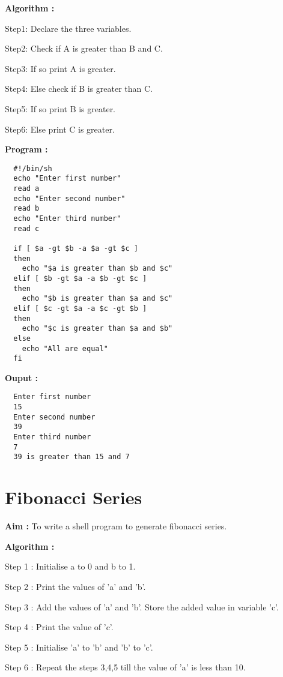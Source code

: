 \documentclass[journal,onecolumn]{IEEEtran}
\begin{document}
\textbf{Algorithm : }
\begin{list}{}{}
  \item Step1: Declare the three variables.
  \item Step2: Check if A is greater than B and
        C.
  \item Step3: If so print A is greater.
  \item Step4: Else check if B is greater than
        C.
  \item Step5: If so print B is greater.
  \item Step6: Else print C is greater.
\end{list}

\textbf{Program : }
\begin{verbatim}
  #!/bin/sh
  echo "Enter first number"
  read a
  echo "Enter second number"
  read b
  echo "Enter third number"
  read c

  if [ $a -gt $b -a $a -gt $c ]
  then
    echo "$a is greater than $b and $c"
  elif [ $b -gt $a -a $b -gt $c ]
  then
    echo "$b is greater than $a and $c"
  elif [ $c -gt $a -a $c -gt $b ]
  then
    echo "$c is greater than $a and $b"
  else
    echo "All are equal"
  fi
\end{verbatim}

\textbf{Ouput :}
\begin{verbatim}
  Enter first number
  15
  Enter second number
  39
  Enter third number
  7 
  39 is greater than 15 and 7
\end{verbatim}

\section{Fibonacci Series}
\textbf{Aim : } To write a shell program to generate fibonacci series.

\textbf{Algorithm : }
\begin{list}{}{}
  \item Step 1 : Initialise a to 0 and b to
        1.
  \item Step 2 : Print the values of 'a'
        and 'b'.
  \item Step 3 : Add the values of 'a' and 'b'. Store the added value in
        variable 'c'.
  \item Step 4 : Print the value of 'c'.
  \item Step 5 : Initialise 'a' to 'b' and 'b' to 'c'.
  \item Step 6 : Repeat the steps 3,4,5 till the value of 'a' is less than 10.
\end{list}
\end{document}
